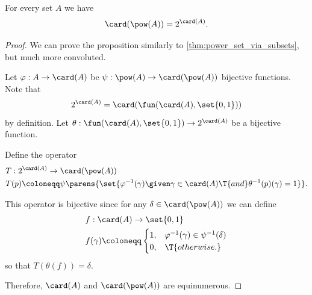 \begin{proposition}\label{thm:cardinal_exponentiation_power_set}
  For every set \( A \) we have
  \begin{equation*}
    \card(\pow(A)) = 2^{\card(A)}.
  \end{equation*}
\end{proposition}
\begin{proof}
  We can prove the proposition similarly to \cref{thm:power_set_via_subsets}, but much more convoluted.

  Let \( \varphi: A \to \card(A) \) be \( \psi: \pow(A) \to \card(\pow(A)) \) bijective functions. Note that
  \begin{equation*}
    2^{\card(A)} = \card(\fun(\card(A), \set{ 0, 1 }))
  \end{equation*}
  by definition. Let \( \theta: \fun(\card(A), \set{ 0, 1 }) \to 2^{\card(A)} \) be a bijective function.

  Define the operator
  \begin{equation*}
    \begin{aligned}
      &T: 2^{\card(A)} \to \card(\pow(A)) \\
      &T(p) \coloneqq \psi\parens{ \set{ \varphi^{-1}(\gamma) \given \gamma \in \card(A) \T{and} \theta^{-1}(p)(\gamma) = 1 } }.
    \end{aligned}
  \end{equation*}

  This operator is bijective since for any \( \delta \in \card(\pow(A)) \) we can define
  \begin{equation*}
    \begin{aligned}
      &f: \card(A) \to \set{ 0, 1 } \\
      &f(\gamma) \coloneqq \begin{cases}
        1, &\varphi^{-1}(\gamma) \in \psi^{-1}(\delta) \\
        0, &\T{otherwise.}
      \end{cases}
    \end{aligned}
  \end{equation*}
  so that \( T(\theta(f)) = \delta \).

  Therefore, \( \card(A) \) and \( \card(\pow(A)) \) are equinumerous.
\end{proof}

